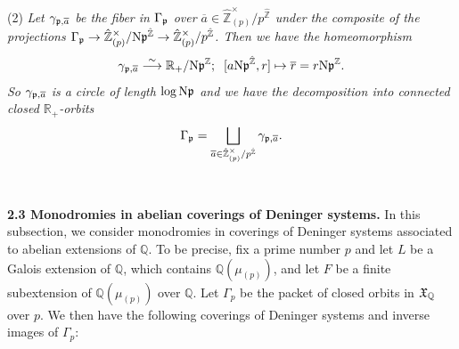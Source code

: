 \documentclass[12pt, leqno]{article}
\begin{document}
(2) {\it  Let $\gamma_{\frak{p}, \overline{a}}$ be the fiber in $\Gamma_{\frak{p}}$ over $\overline{a} \in \hat{\mathbb{Z}}_{(p)}^{\times}/p^{\hat{\mathbb{Z}}}$ under the composite of the projections $\Gamma_{\frak{p}} \rightarrow  \hat{\mathbb{Z}}_{(p)}^{\times}/{\rm N}\frak{p}^{\hat{\mathbb{Z}}} \rightarrow \hat{\mathbb{Z}}_{(p)}^{\times}/p^{\hat{\mathbb{Z}}}$.  Then we have the homeomorphism}
 $$ \gamma_{\frak{p}, \overline{a} } \stackrel{\sim}{\longrightarrow} \mathbb{R}_+/{\rm N}\frak{p}^{\mathbb{Z}}; \; \; [a{\rm N}\frak{p}^{\hat{\mathbb{Z}}} , r] \mapsto \overline{r} = r {\rm N}\frak{p}^{\mathbb{Z}} .$$
{\it So $\gamma_{\frak{p}, \overline{a}}$ is a circle of length $\log {\rm N}\frak{p}$ and we have the decomposition into connected closed $\mathbb{R}_+$-orbits}
$$\Gamma_{\frak{p}} = \bigsqcup_{\overline{a} \in \hat{\mathbb{Z}}_{(p)}^{\times}/p^{\hat{\mathbb{Z}}} } \gamma_{\frak{p}, \overline{a} }.$$ 
\\
\\
{\bf 2.3  Monodromies in abelian coverings of Deninger systems.} In this subsection, we consider monodromies in coverings of Deninger systems associated to abelian extensions of $\mathbb{Q}$. To be precise, 
fix a prime number $p$ and let $L$ be a Galois extension of $\mathbb{Q}$, which contains $\mathbb{Q}(\mu_{(p)})$, and let $F$ be a finite subextension of $\mathbb{Q}(\mu_{(p)})$ over $\mathbb{Q}$.  Let $\Gamma_p$ be the packet  of closed orbits in $\frak{X}_{\mathbb{Q}}$ over $p$. We then have the following coverings of Deninger systems and inverse images of $\Gamma_p$:
\begin{center}
\end{center}
\end{document}

